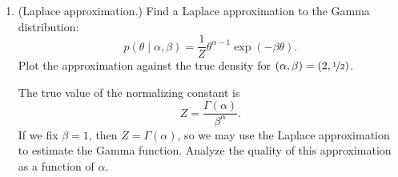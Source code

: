 \documentclass{article}
\newcommand{\given}{\mid}
\begin{document}
\begin{enumerate}
\item
  (Laplace approximation.)
  Find a Laplace approximation to the Gamma distribution:
  \begin{equation*}
    p(\theta \given \alpha, \beta)
    =
    \frac{1}{Z}
    \theta^{\alpha - 1}
    \exp(-\beta\theta).
  \end{equation*}
  Plot the approximation against the true density for $(\alpha, \beta)
  = (2, \nicefrac{1}{2})$.

  The true value of the normalizing constant is
  \begin{equation*}
    Z = \frac{\Gamma(\alpha)}{\beta^\alpha}.
  \end{equation*}
  If we fix $\beta = 1$, then $Z = \Gamma(\alpha)$, so we may use the
  Laplace approximation to estimate the Gamma function.  Analyze the
  quality of this approximation as a function of $\alpha$.

\end{enumerate}
\end{document}
